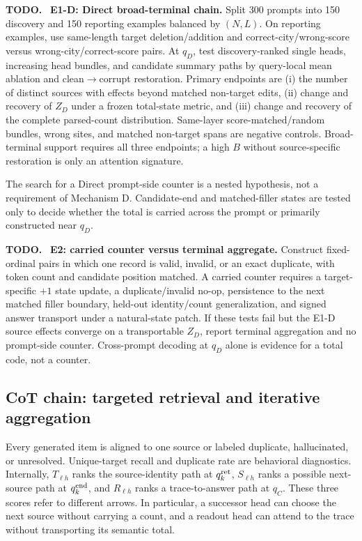 \documentclass[11pt]{article}
\newenvironment{todobox}
  {\begin{center}\begin{minipage}{0.95\linewidth}\color{todored}\textbf{TODO.}~}
  {\end{minipage}\end{center}}
\begin{document}
\begin{todobox}
\textbf{E1-D: Direct broad-terminal chain.} Split 300 prompts into 150 discovery and 150 reporting examples balanced by $(N,L)$. On reporting examples, use same-length target deletion/addition and correct-city/wrong-score versus wrong-city/correct-score pairs. At $q_D$, test discovery-ranked single heads, increasing head bundles, and candidate summary paths by query-local mean ablation and clean$\rightarrow$corrupt restoration. Primary endpoints are (i) the number of distinct sources with effects beyond matched non-target edits, (ii) change and recovery of $Z_D$ under a frozen total-state metric, and (iii) change and recovery of the complete parsed-count distribution. Same-layer score-matched/random bundles, wrong sites, and matched non-target spans are negative controls. Broad-terminal support requires all three endpoints; a high $B$ without source-specific restoration is only an attention signature.
\end{todobox}

The search for a Direct prompt-side counter is a nested hypothesis, not a requirement of Mechanism D. Candidate-end and matched-filler states are tested only to decide whether the total is carried across the prompt or primarily constructed near $q_D$.

\begin{todobox}
\textbf{E2: carried counter versus terminal aggregate.} Construct fixed-ordinal pairs in which one record is valid, invalid, or an exact duplicate, with token count and candidate position matched. A carried counter requires a target-specific $+1$ state update, a duplicate/invalid no-op, persistence to the next matched filler boundary, held-out identity/count generalization, and signed answer transport under a natural-state patch. If these tests fail but the E1-D source effects converge on a transportable $Z_D$, report terminal aggregation and no prompt-side counter. Cross-prompt decoding at $q_D$ alone is evidence for a total code, not a counter.
\end{todobox}

\subsection{CoT chain: targeted retrieval and iterative aggregation}

Every generated item is aligned to one source or labeled duplicate, hallucinated, or unresolved. Unique-target recall and duplicate rate are behavioral diagnostics. Internally, $T_{\ell h}$ ranks the source-identity path at $q_k^{\rm ret}$, $S_{\ell h}$ ranks a possible next-source path at $q_k^{\rm end}$, and $R_{\ell h}$ ranks a trace-to-answer path at $q_C$. These three scores refer to different arrows. In particular, a successor head can choose the next source without carrying a count, and a readout head can attend to the trace without transporting its semantic total.
\end{document}
